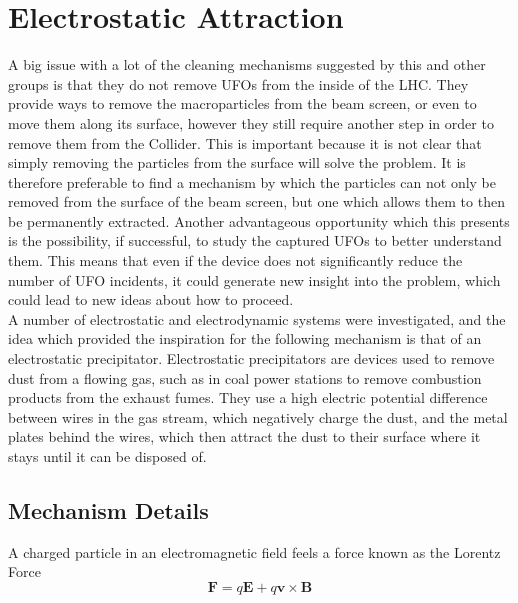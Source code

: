 \documentclass[../main.tex]{subfiles}
\begin{document}
\section{Electrostatic Attraction}
A big issue with a lot of the cleaning mechanisms suggested by this and other groups is that they do not remove UFOs from the inside of the LHC.
They provide ways to remove the macroparticles from the beam screen, or even to move them along its surface, however they still require another step in order to remove them from the Collider.
This is important because it is not clear that simply removing the particles from the surface will solve the problem.
It is therefore preferable to find a mechanism by which the particles can not only be removed from the surface of the beam screen, but one which allows them to then be permanently extracted.
Another advantageous opportunity which this presents is the possibility, if successful, to study the captured UFOs to better understand them.
This means that even if the device does not significantly reduce the number of UFO incidents, it could generate new insight into the problem, which could lead to new ideas about how to proceed.\\

A number of electrostatic and electrodynamic systems were investigated, and the idea which provided the inspiration for the following mechanism is that of an electrostatic precipitator.
Electrostatic precipitators are devices used to remove dust from a flowing gas, such as in coal power stations to remove combustion products from the exhaust fumes.
They use a high electric potential difference between wires in the gas stream, which negatively charge the dust, and the metal plates behind the wires, which then attract the dust to their surface where it stays until it can be disposed of.

\subsection{Mechanism Details}
A charged particle in an electromagnetic field feels a force known as the Lorentz Force
\begin{equation}
\textbf{F} = q\textbf{E} + q\textbf{v}\times\textbf{B}
\end{equation}
\end{document}
